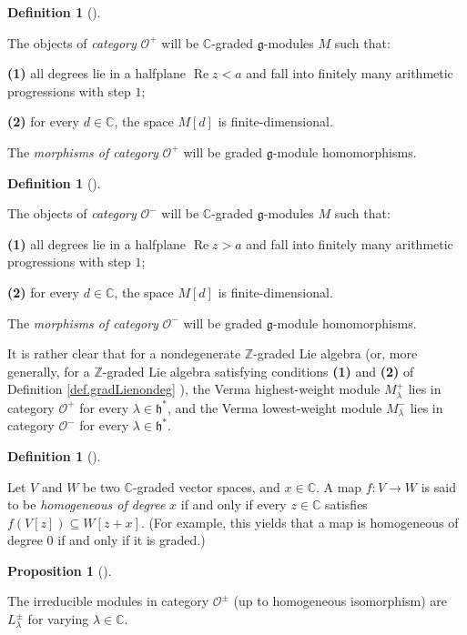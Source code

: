 \documentclass
[numbers=enddot,12pt,final,onecolumn,german,notitlepage]{scrartcl}%
\theoremstyle{definition}
\newtheorem{prop}[theo]{Proposition}
\newenvironment{proposition}[1][]
{\begin{prop}[#1]\begin{leftbar}}
{\end{leftbar}\end{prop}}
\newtheorem{defi}[theo]{Definition}
\newenvironment{definition}[1][]
{\begin{defi}[#1]\begin{leftbar}}
{\end{leftbar}\end{defi}}
\begin{document}
\begin{definition}
\label{def.O+}The objects of \textit{category }$\mathcal{O}^{+}$ will be
$\mathbb{C}$-graded $\mathfrak{g}$-modules $M$ such that:

\textbf{(1)} all degrees lie in a halfplane $\operatorname{Re}z<a$ and fall
into finitely many arithmetic progressions with step $1$;

\textbf{(2)} for every $d\in\mathbb{C}$, the space $M\left[  d\right]  $ is finite-dimensional.

The \textit{morphisms of category }$\mathcal{O}^{+}$ will be graded
$\mathfrak{g}$-module homomorphisms.
\end{definition}

\begin{definition}
\label{def.O-}The objects of \textit{category }$\mathcal{O}^{-}$ will be
$\mathbb{C}$-graded $\mathfrak{g}$-modules $M$ such that:

\textbf{(1)} all degrees lie in a halfplane $\operatorname{Re}z>a$ and fall
into finitely many arithmetic progressions with step $1$;

\textbf{(2)} for every $d\in\mathbb{C}$, the space $M\left[  d\right]  $ is finite-dimensional.

The \textit{morphisms of category }$\mathcal{O}^{-}$ will be graded
$\mathfrak{g}$-module homomorphisms.
\end{definition}

It is rather clear that for a nondegenerate $\mathbb{Z}$-graded Lie algebra
(or, more generally, for a $\mathbb{Z}$-graded Lie algebra satisfying
conditions \textbf{(1)} and \textbf{(2)} of Definition \ref{def.gradLienondeg}%
), the Verma highest-weight module $M_{\lambda}^{+}$ lies in category
$\mathcal{O}^{+}$ for every $\lambda\in\mathfrak{h}^{\ast}$, and the Verma
lowest-weight module $M_{\lambda}^{-}$ lies in category $\mathcal{O}^{-}$ for
every $\lambda\in\mathfrak{h}^{\ast}$.

\begin{definition}
Let $V$ and $W$ be two $\mathbb{C}$-graded vector spaces, and $x\in\mathbb{C}%
$. A map $f:V\rightarrow W$ is said to be \textit{homogeneous of degree }$x$
if and only if every $z\in\mathbb{C}$ satisfies $f\left(  V\left[  z\right]
\right)  \subseteq W\left[  z+x\right]  $. (For example, this yields that a
map is homogeneous of degree $0$ if and only if it is graded.)
\end{definition}

\begin{proposition}
\label{prop.O.irred}The irreducible modules in category $\mathcal{O}^{\pm}$
(up to homogeneous isomorphism) are $L_{\lambda}^{\pm}$ for varying
$\lambda\in\mathbb{C}$.
\end{proposition}
\end{document}
